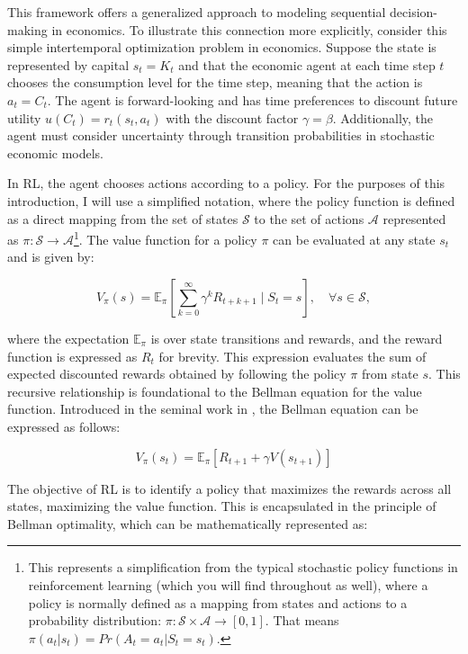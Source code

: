 This framework offers a generalized approach to modeling sequential decision-making in economics. To illustrate this connection more explicitly, consider this simple intertemporal optimization problem in economics. Suppose the state is represented by capital \(s_t = K_t\) and that the economic agent at each time step \(t\) chooses the consumption level for the time step, meaning that the action is \(a_t= C_t\). The agent is forward-looking and has time preferences to discount future utility \(u(C_t) = r_t(s_t, a_t)\) with the discount factor \(\gamma = \beta\). Additionally, the agent must consider uncertainty through transition probabilities in stochastic economic models.

In RL, the agent chooses actions according to a policy. For the purposes of this introduction, I will use a simplified notation, where the policy function is defined as a direct mapping from the set of states \(\mathcal{S}\) to the set of actions \(\mathcal{A}\) represented as \(\pi: \mathcal{S} \rightarrow \mathcal{A}\)\footnote{This represents a simplification from the typical stochastic policy functions in reinforcement learning (which you will find throughout \textcite{Sutton2018intro_to_rl} as well), where a policy is normally defined as a mapping from states and actions to a probability distribution: \(\pi: \mathcal{S} \times \mathcal{A} \rightarrow [0,1]\). That means \(\pi(a_t|s_t) = Pr(A_t=a_t | S_t=s_t)\).}. The value function for a policy \(\pi\) can be evaluated at any state \(s_t\) and is given by:

\begin{equation}
    V_{\pi}(s) = \mathbb{E}_\pi\left[ \sum_{k=0}^{\infty} \gamma^k R_{t+k+1} \mid S_t = s \right], \quad \forall s \in \mathcal{S},
\end{equation}

where the expectation \(\mathbb{E}_\pi\) is over state transitions and rewards, and the reward function is expressed as \(R_t\) for brevity. This expression evaluates the sum of expected discounted rewards obtained by following the policy \(\pi\) from state \(s\). This recursive relationship is foundational to the Bellman equation for the value function. Introduced in the seminal work in \textcite{BELLMAN1957AMDP}, the Bellman equation can be expressed as follows:

\begin{equation}
    V_\pi(s_t) = \mathbb{E}_\pi [R_{t+1} + \gamma V(s_{t+1})]
\end{equation}

The objective of RL is to identify a policy that maximizes the rewards across all states, maximizing the value function. This is encapsulated in the principle of Bellman optimality, which can be mathematically represented as:

